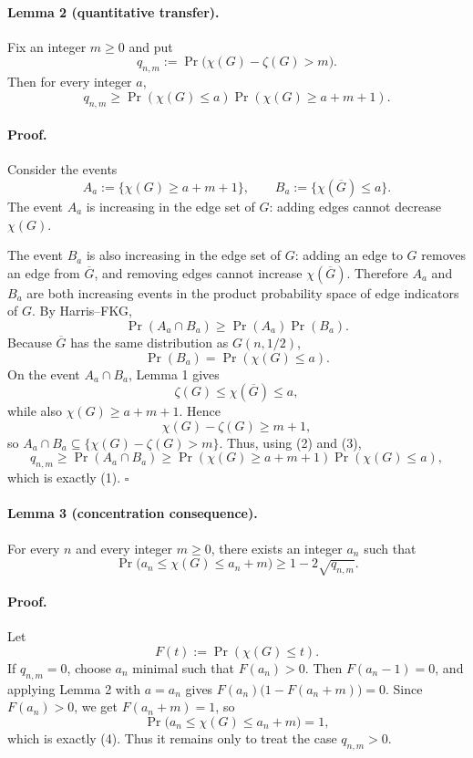 \paragraph{Lemma 2 (quantitative transfer).}
Fix an integer $m\ge 0$ and put
\[
q_{n,m}:=\Pr\bigl(\chi(G)-\zeta(G)>m\bigr).
\]
Then for every integer $a$,
\[
q_{n,m}\ge \Pr(\chi(G)\le a)\Pr(\chi(G)\ge a+m+1).
\tag{1}
\]

\paragraph{Proof.}
Consider the events
\[
A_a:=\{\chi(G)\ge a+m+1\},
\qquad
B_a:=\{\chi(\overline G)\le a\}.
\]
The event $A_a$ is increasing in the edge set of $G$:
adding edges cannot decrease $\chi(G)$.

The event $B_a$ is also increasing in the edge set of $G$:
adding an edge to $G$ removes an edge from $\overline G$,
and removing edges cannot increase $\chi(\overline G)$.
Therefore $A_a$ and $B_a$ are both increasing events in the product probability space
of edge indicators of $G$.
By Harris--FKG,
\[
\Pr(A_a\cap B_a)\ge \Pr(A_a)\Pr(B_a).
\tag{2}
\]
Because $\overline G$ has the same distribution as $G(n,1/2)$,
\[
\Pr(B_a)=\Pr(\chi(G)\le a).
\tag{3}
\]
On the event $A_a\cap B_a$, Lemma 1 gives
\[
\zeta(G)\le \chi(\overline G)\le a,
\]
while also $\chi(G)\ge a+m+1$.
Hence
\[
\chi(G)-\zeta(G)\ge m+1,
\]
so $A_a\cap B_a\subseteq \{\chi(G)-\zeta(G)>m\}$.
Thus, using (2) and (3),
\[
q_{n,m}\ge \Pr(A_a\cap B_a)\ge \Pr(\chi(G)\ge a+m+1)\Pr(\chi(G)\le a),
\]
which is exactly (1). \hfill $\square$

\paragraph{Lemma 3 (concentration consequence).}
For every $n$ and every integer $m\ge 0$, there exists an integer $a_n$ such that
\[
\Pr\bigl(a_n\le \chi(G)\le a_n+m\bigr)\ge 1-2\sqrt{q_{n,m}}.
\tag{4}
\]

\paragraph{Proof.}
Let
\[
F(t):=\Pr(\chi(G)\le t).
\]
If $q_{n,m}=0$, choose $a_n$ minimal such that $F(a_n)>0$.
Then $F(a_n-1)=0$, and applying Lemma 2 with $a=a_n$ gives
$F(a_n)\bigl(1-F(a_n+m)\bigr)=0$.
Since $F(a_n)>0$, we get $F(a_n+m)=1$, so
\[
\Pr\bigl(a_n\le \chi(G)\le a_n+m\bigr)=1,
\]
which is exactly (4). Thus it remains only to treat the case $q_{n,m}>0$.

